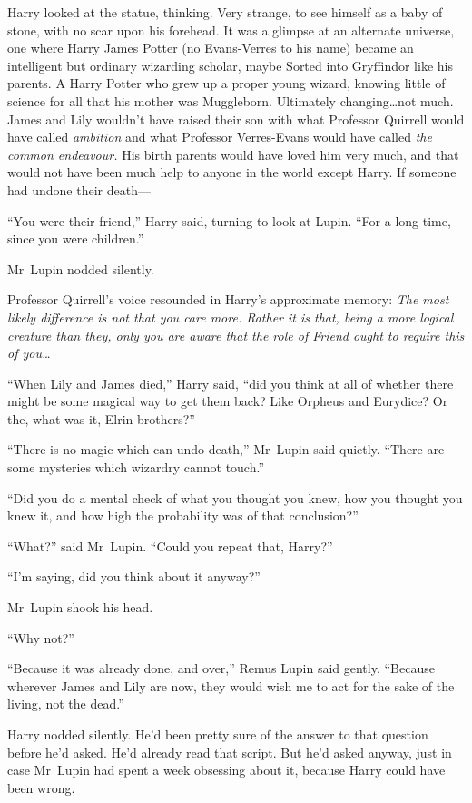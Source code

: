 Harry looked at the statue, thinking. Very strange, to see himself as a baby of
stone, with no scar upon his forehead. It was a glimpse at an alternate
universe, one where Harry James Potter (no Evans-Verres to his name) became an
intelligent but ordinary wizarding scholar, maybe Sorted into Gryffindor like
his parents. A Harry Potter who grew up a proper young wizard, knowing little
of science for all that his mother was Muggleborn. Ultimately changing…not
much. James and Lily wouldn’t have raised their son with what Professor
Quirrell would have called \emph{ambition} and what Professor Verres-Evans
would have called \emph{the common endeavour.} His birth parents would have
loved him very much, and that would not have been much help to anyone in the
world except Harry. If someone had undone their death—

“You were their friend,” Harry said, turning to look at Lupin. “For a long
time, since you were children.”

Mr~Lupin nodded silently.

Professor Quirrell’s voice resounded in Harry’s approximate memory: \emph{The
most likely difference is not that you care more. Rather it is that, being a
more logical creature than they, only you are aware that the role of Friend
ought to require this of you…}

“When Lily and James died,” Harry said, “did you think at all of whether there
might be some magical way to get them back? Like Orpheus and Eurydice? Or the,
what was it, Elrin brothers?”

“There is no magic which can undo death,” Mr~Lupin said quietly. “There are
some mysteries which wizardry cannot touch.”

“Did you do a mental check of what you thought you knew, how you thought you
knew it, and how high the probability was of that conclusion?”

“What?” said Mr~Lupin. “Could you repeat that, Harry?”

“I’m saying, did you think about it anyway?”

Mr~Lupin shook his head.

“Why not?”

“Because it was already done, and over,” Remus Lupin said gently. “Because
wherever James and Lily are now, they would wish me to act for the sake of the
living, not the dead.”

Harry nodded silently. He’d been pretty sure of the answer to that question
before he’d asked. He’d already read that script. But he’d asked anyway, just
in case Mr~Lupin had spent a week obsessing about it, because Harry could have
been wrong.

